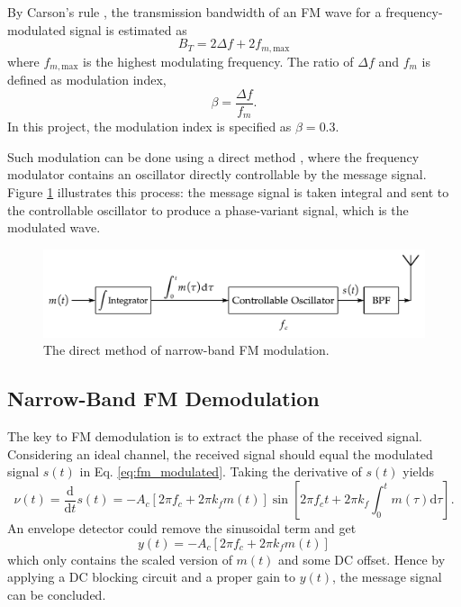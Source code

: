 \documentclass[../ECE459FinalProjectReport.tex]{subfiles}
\begin{document}
By Carson's rule \cites[Sec. 4.6]{haykinIntroductionAnalogDigital2007}{CarsonRule2017}, the transmission bandwidth of an FM wave for a frequency-modulated signal is estimated as
\begin{equation}
    B_T = 2\Delta f + 2f_{m,\mathrm{max}}
\end{equation}
where $f_{m,\mathrm{max}}$ is the highest modulating frequency. The ratio of $\Delta f$ and $f_m$ is defined as modulation index,
\begin{equation}
    \beta = \frac{\Delta f}{f_m}.
\end{equation}
In this project, the modulation index is specified as $\beta=0.3$.

Such modulation can be done using a direct method \cite[Sec. 4.7]{haykinIntroductionAnalogDigital2007}, where the frequency modulator contains an oscillator directly controllable by the message signal. Figure \ref{fig:fm-mod} illustrates this process: the message signal is taken integral and sent to the controllable oscillator to produce a phase-variant signal, which is the modulated wave.


\begin{figure}[tb]
    \centering
    \includegraphics[scale=0.6]{plots/fm_mod.pdf}
    \caption{The direct method of narrow-band FM modulation.}
    \label{fig:fm-mod}
\end{figure}


\subsection{Narrow-Band FM Demodulation}
The key to FM demodulation is to extract the phase of the received signal. Considering an ideal channel, the received signal should equal the modulated signal $s(t)$ in Eq. \eqref{eq:fm_modulated}. Taking the derivative of $s(t)$ yields
\begin{equation}
    \nu \left( t \right) =\frac{\mathrm{d}}{\mathrm{d}t}s\left( t \right) =-A_c\left[ 2\pi f_c+2\pi k_fm\left( t \right) \right] \sin \left[ 2\pi f_ct+2\pi k_f\int_0^t{m\left( \tau \right) \mathrm{d}\tau} \right].
\end{equation}
An envelope detector could remove the sinusoidal term and get
\begin{equation}
    y\left( t \right) = -A_c\left[ 2\pi f_c+2\pi k_fm\left( t \right) \right]
\end{equation}
which only contains the scaled version of $m(t)$ and some DC offset. Hence by applying a DC blocking circuit and a proper gain to $y(t)$, the message signal can be concluded.
\end{document}

